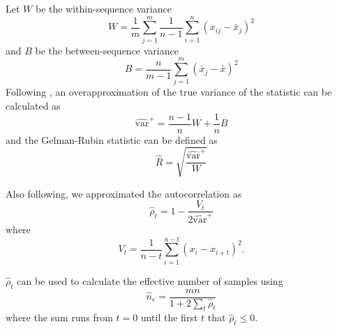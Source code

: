 \documentclass{article}
\begin{document}
Let $W$ be the within-sequence variance
\[
W = \frac{1}{m} \sum_{j=1}^m \frac{1}{n-1} \sum_{i=1}^n (x_{ij} - \bar{x}_j)^2
\]
and $B$ be the between-sequence variance
\[
B = \frac{n}{m-1}\sum_{j=1}^m (\bar{x}_j - \bar{x})^2
\]
Following \cite{gelman2013bayesian}, an overapproximation of the true variance of the statistic can be calculated as
\[
\widehat{\text{var}}^+ = \frac{n-1}{n}W + \frac{1}{n}B
\]
and the Gelman-Rubin statistic can be defined as
\[
\hat{R} = \sqrt{\frac{\widehat{\text{var}}^+}{W}}
\]

Also following\cite{gelman2013bayesian}, we approximated the autocorrelation as
\[
\hat{\rho}_t = 1 - \frac{V_t}{2\widehat{\text{var}}^+}
\]
where
\[
V_t = \frac{1}{n-t} \sum_{i=1}^{n-t} (x_i - x_{i+t})^2.
\]

$\hat{\rho}_t$ can be used to calculate the effective number of samples using
\[
\hat{n}_e = \frac{mn}{1 + 2\sum_{t} \hat{\rho}_t}
\]
where the sum runs from $t=0$ until the first $t$ that $\hat{\rho}_t \le 0$.

%
% 


\end{document}
